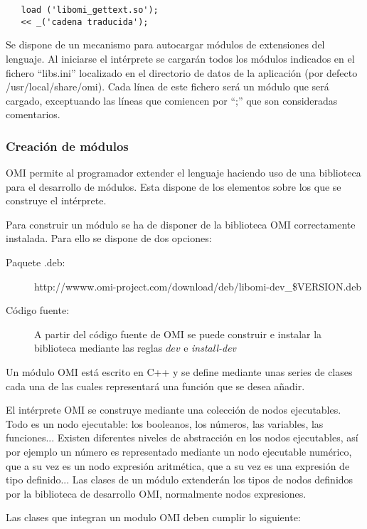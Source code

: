 \begin{lstlisting}  
   load ('libomi_gettext.so');
   << _('cadena traducida');
\end{lstlisting}

Se dispone de un mecanismo para autocargar módulos de extensiones del lenguaje. Al iniciarse 
el intérprete se cargarán todos los módulos indicados en el fichero ``libs.ini'' localizado 
en el directorio de datos de la aplicación (por defecto /usr/local/share/omi). Cada línea 
de este fichero será un módulo que será cargado, exceptuando las líneas que comiencen por ``;'' que
son consideradas comentarios.

\subsubsection{Creación de módulos}
OMI permite al programador extender el lenguaje haciendo uso de una biblioteca para el desarrollo de módulos. Esta
dispone de los elementos sobre los que se construye el intérprete. 

Para construir un módulo se ha de disponer de la biblioteca OMI correctamente instalada. Para ello se
dispone de dos opciones:

\begin{description}
\item[Paquete .deb:] http://wwww.omi-project.com/download/deb/libomi-dev\_\$VERSION.deb
\item[Código fuente:] A partir del código fuente de OMI se puede construir e instalar la biblioteca 
mediante las reglas $dev$ e \emph{install-dev}
\end{description}

Un módulo OMI está escrito en C++ y se define mediante unas series de clases cada una de las cuales representará una
función que se desea añadir. 

El intérprete OMI se construye mediante una colección de nodos ejecutables. Todo es un nodo ejecutable: los booleanos,
los números, las variables, las funciones... Existen diferentes niveles de abstracción en los nodos ejecutables, así por ejemplo
un número es representado mediante un nodo ejecutable numérico, que a su vez es un nodo expresión aritmética, que a su vez es
una expresión de tipo definido... Las clases de un módulo extenderán los tipos de nodos definidos por la biblioteca de desarrollo OMI, 
normalmente nodos expresiones.

Las clases que integran un modulo OMI deben cumplir lo siguiente:


